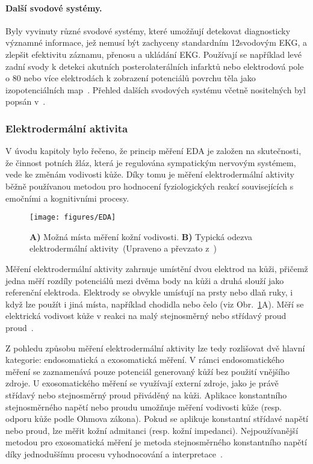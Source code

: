 \paragraph{Další svodové systémy.}
Byly vyvinuty různé svodové systémy, které umožňují detekovat diagnosticky
významné informace, jež nemusí být zachyceny standardním 12svodovým EKG, a
zlepšit efektivitu záznamu, přenosu a ukládání EKG. Používají se například levé
zadní svody k detekci akutních posterolaterálních infarktů nebo elektrodová pole
o 80 nebo více elektrodách k zobrazení potenciálů povrchu těla jako izopotenciálních
map~\cite{Goldberger2017,mirvis2001}. Přehled dalších svodových systému včetně
nositelných byl popsán v~\cite{Baig2013,Majumder2018,Serhani2020}.

\subsubsection{Elektrodermální aktivita}
V úvodu kapitoly bylo řečeno, že princip měření EDA je založen na skutečnosti,
že činnost potních žláz, která je regulována sympatickým nervovým systémem, vede
ke změnám vodivosti kůže. Díky tomu je měření elektrodermální aktivity běžně
používanou metodou pro hodnocení fyziologických reakcí souvisejících s emočními
a kognitivními procesy.

\begin{figure}[htb!]
    \begin{center}
        \texttt{[image: figures/EDA]}
        \caption{\textbf{A)} Možná místa měření kožní vodivosti. \textbf{B)}
            Typická odezva elektrodermální aktivity~(Upraveno a převzato
            z~\cite{Janssen2012,Vavrinsky2021})}
        \label{fig:eda_mereni}
    \end{center}
\end{figure}

Měření elektrodermální aktivity zahrnuje umístění dvou elektrod na kůži, přičemž
jedna měří rozdíly potenciálů mezi dvěma body na kůži a druhá slouží jako
referenční elektroda. Elektrody se obvykle umísťují na prsty nebo dlaň ruky, i
když lze použít i jiná místa, například chodidla nebo čelo (viz
Obr.~\ref{fig:eda_mereni}A). Měří se elektrická vodivost kůže v reakci na malý
stejnosměrný nebo střídavý proud proud~\cite{Caruelle2019,Boucsein2012}.

Z pohledu způsobu měření elektrodermální aktivity lze tedy rozlišovat dvě hlavní
kategorie: endosomatická a exosomatická měření. V rámci endosomatického měření
se zaznamenává pouze potenciál generovaný kůží bez použití vnějšího zdroje. U
exosomatického měření se využívají externí zdroje, jako je právě střídavý nebo
stejnosměrný proud přiváděný na kůži. Aplikace konstantního stejnosměrného
napětí nebo proudu umožňuje měření vodivosti kůže (resp. odporu kůže podle
Ohmova zákona). Pokud se aplikuje konstantní střídavé napětí nebo proud, lze
měřit kožní admitanci (resp. kožní impedanci). Nejpoužívanější metodou pro
exosomatická měření je metoda stejnosměrného konstantního napětí díky
jednoduššímu procesu vyhodnocování a
interpretace~\cite{Boucsein2012,Li2022,Posada2020,Caruelle2019}.

